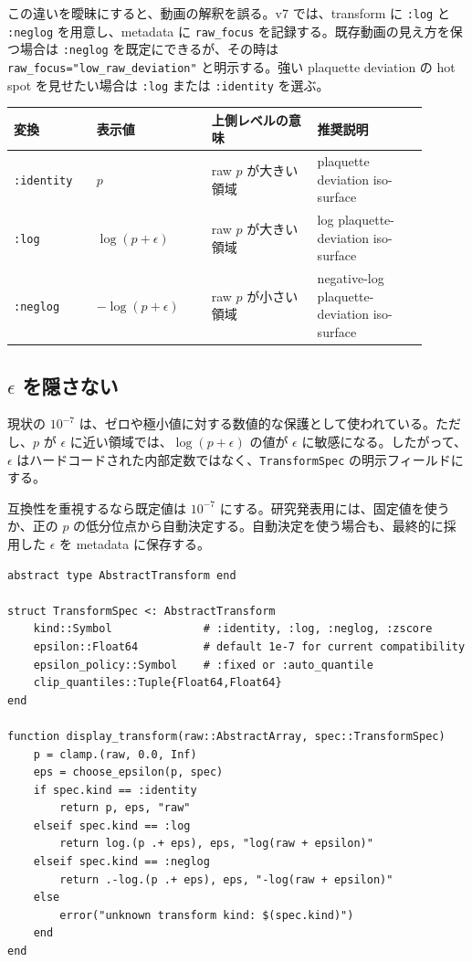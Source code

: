 \documentclass[uplatex,dvipdfmx,ja=standard,11pt,a4paper]{bxjsarticle}
\newcommand{\code}[1]{\texttt{#1}}
\begin{document}
この違いを曖昧にすると、動画の解釈を誤る。v7 では、transform に \code{:log} と \code{:neglog} を用意し、metadata に \code{raw\_focus} を記録する。既存動画の見え方を保つ場合は \code{:neglog} を既定にできるが、その時は \code{raw\_focus="low\_raw\_deviation"} と明示する。強い plaquette deviation の hot spot を見せたい場合は \code{:log} または \code{:identity} を選ぶ。

\begin{longtable}{p{0.18\linewidth}p{0.25\linewidth}p{0.23\linewidth}p{0.24\linewidth}}
\toprule
変換 & 表示値 & 上側レベルの意味 & 推奨説明 \\
\midrule
\code{:identity} & \(p\) & raw \(p\) が大きい領域 & plaquette deviation iso-surface \\
\code{:log} & \(\log(p+\epsilon)\) & raw \(p\) が大きい領域 & log plaquette-deviation iso-surface \\
\code{:neglog} & \(-\log(p+\epsilon)\) & raw \(p\) が小さい領域 & negative-log plaquette-deviation iso-surface \\
\bottomrule
\end{longtable}

\subsection{\texorpdfstring{$\epsilon$}{epsilon} を隠さない}
現状の \(10^{-7}\) は、ゼロや極小値に対する数値的な保護として使われている\cite{VisualizingVisualization}。ただし、\(p\) が \(\epsilon\) に近い領域では、\(\log(p+\epsilon)\) の値が \(\epsilon\) に敏感になる。したがって、\(\epsilon\) はハードコードされた内部定数ではなく、\code{TransformSpec} の明示フィールドにする。

互換性を重視するなら既定値は \(10^{-7}\) にする。研究発表用には、固定値を使うか、正の \(p\) の低分位点から自動決定する。自動決定を使う場合も、最終的に採用した \(\epsilon\) を metadata に保存する。

\begin{lstlisting}[style=julia,caption={対数変換を明示する型案}]
abstract type AbstractTransform end

struct TransformSpec <: AbstractTransform
    kind::Symbol              # :identity, :log, :neglog, :zscore
    epsilon::Float64          # default 1e-7 for current compatibility
    epsilon_policy::Symbol    # :fixed or :auto_quantile
    clip_quantiles::Tuple{Float64,Float64}
end

function display_transform(raw::AbstractArray, spec::TransformSpec)
    p = clamp.(raw, 0.0, Inf)
    eps = choose_epsilon(p, spec)
    if spec.kind == :identity
        return p, eps, "raw"
    elseif spec.kind == :log
        return log.(p .+ eps), eps, "log(raw + epsilon)"
    elseif spec.kind == :neglog
        return .-log.(p .+ eps), eps, "-log(raw + epsilon)"
    else
        error("unknown transform kind: $(spec.kind)")
    end
end
\end{lstlisting}
\end{document}
